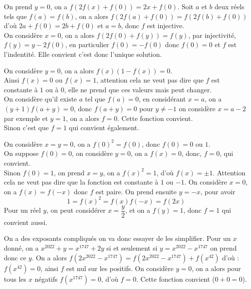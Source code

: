 \begin{sol}[][2]
On prend $y=0$, on a $f(2f(x)+f(0))=2x+f(0)$. Soit $a$ et $b$ deux réels tels que $f(a)=f(b)$, on a alors $f(2f(a)+f(0))=f(2f(b)+f(0))$ d'où $2a+f(0)=2b+f(0)$ et $a=b$, donc $f$ est injective.\\
On considère $x=0$, on a alors $f(2f(0)+f(y))=f(y)$, par injectivité, $f(y)=y-2f(0)$, en particulier $f(0)=-f(0)$ donc $f(0)=0$ et $f$ est l'indentité. Elle convient c'est donc l'unique solution.
\end{sol}
\begin{sol}[][3]
On considère $y=0$, on a alors $f(x)(1-f(x))=0$.\\
Ainsi $f(x)=0$ ou $f(x)=1$, attention cela ne veut pas dire que $f$ est constante à $1$ ou à $0$, elle ne prend que ces valeurs mais peut changer.\\
On considère qu'il existe $a$ tel que $f(a)=0$, en considérant $x=a$, on a $(y+1)f(a+y)=0$, donc $f(a+y)=0$ pour $y\ne-1$ on considère $x=a-2$ par exemple et $y=1$, on a alors $f=0$. Cette fonction convient. \\
Sinon c'est que $f=1$ qui convient également.
\end{sol}
\begin{sol}[][4]
On considère $x=y=0$, on a $f(0)^2=f(0)$, donc $f(0)=0$ ou $1$.\\
On suppose $f(0)=0$, on considère $y=0$, on a $f(x)=0$, donc, $f=0$, qui convient.\\
Sinon $f(0)=1$, on prend $x=y$, on a $f(x)^2=1$, d'où $f(x)=\pm1$. Attention cela ne veut pas dire que la fonction est constante à $1$ ou $-1$. On considère $x=0$, on a $f(x)=f(-x)$ donc $f$ est paire. On prend ensuite $y=-x$, pour avoir $$1=f(x)^2=f(x)f(-x)=f(2x)$$
Pour un réel $y$, on peut considérer $x=\dfrac y2$, et on a $f(y)=1$, donc $f=1$ qui convient aussi. 
\end{sol}
\begin{sol}[][5]
On a des exposants compliqués on va donc essayer de les simplifier. Pour un $x$ donné, on a $x^{2022}+y=x^{1747}+2y$ si et seulement si $y=x^{2022}-x^{1747}$ on prend donc ce $y$. On a alors $f(2x^{2022}-x^{1747})=f(2x^{2022}-x^{1747})+f(x^{42})$ d'où : $f(x^{42})=0$, ainsi $f$ est nul sur les positifs. On considère $y=0$, on a alors pour tous les $x$ négatifs $f(x^{1747})=0$, d'où $f=0$. Cette fonction convient ($0+0=0$).
\end{sol}
